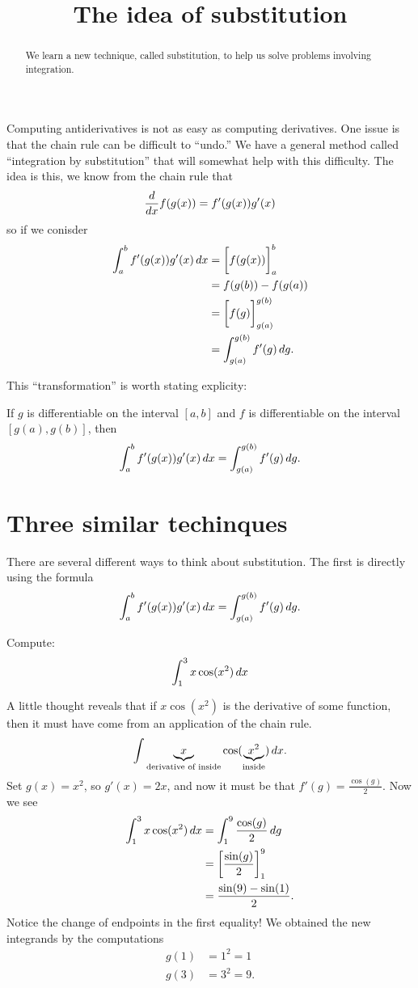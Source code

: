 \documentclass{ximera}
\title[Dig-In:]{The idea of substitution}
\begin{document}
\begin{abstract}
  We learn a new technique, called substitution, to help us solve
  problems involving integration.
\end{abstract}
\maketitle


Computing antiderivatives is not as easy as computing derivatives.
One issue is that the chain rule can be difficult to ``undo.''  We
have a general method called ``integration by substitution'' that will
somewhat help with this difficulty. The idea is this, we know from the
chain rule that
\[
\frac{d}{\mathop{}\!d x} f(g(x)) = f'(g(x))g'(x)
\]
so if we conisder
\begin{align*}
  \int_a^b f'(g(x))g'(x) \mathop{}\!d x &= \bigg[ f(g(x)) \bigg]_a^b \\
  &= f(g(b)) - f(g(a)) \\
  &= \bigg[ f(g) \bigg]_{g(a)}^{g(b)}\\
  &= \int_{g(a)}^{g(b)}f'(g) \mathop{}\!d g.
\end{align*}

This ``transformation'' is worth stating explicity:

\begin{theorem} 
If $g$ is differentiable on the interval $[a,b]$ and $f$ is
differentiable on the interval $[g(a),g(b)]$, then
\[
\int_a^b f'(g(x)) g'(x) \mathop{}\!d x =\int_{g(a)}^{g(b)} f'(g) \mathop{}\!d g.
\]
\end{theorem}

\section{Three similar techinques}

There are several different ways to think about substitution. The
first is directly using the formula
\[
\int_a^b f'(g(x)) g'(x) \mathop{}\!d x = \int_{g(a)}^{g(b)} f'(g) \mathop{}\!d g.
\]
\begin{example}
Compute:
\[
\int_1^3 x\cos(x^2)\mathop{}\!d x
\]
\begin{explanation}
A little thought reveals that if $x\cos(x^2)$ is the derivative of
some function, then it must have come from an application of the chain
rule. 
\[
\int \underbrace{x}_{\text{derivative of inside}}\cos(\underbrace{x^2}_{\text{inside}})\mathop{}\!d x.
\]
Set $g(x) = x^2$, so $g'(x) = 2x$, and now it must be that $f'(g) =
\frac{\cos(g)}{2}$. Now we see
\begin{align*}
\int_1^3 x\cos(x^2)\mathop{}\!d x &= \int_1^9 \frac{\cos(g)}{2}\mathop{}\!d g\\
&= \bigg[ \frac{\sin(g)}{2} \bigg]_1^9 \\
&= \frac{\sin(9) -\sin(1)}{2}.
\end{align*}
Notice the change of endpoints in the first equality!  
We obtained the new integrands by the computations
\begin{align*}
g(1) &= 1^2 = 1  \\
g(3) &= 3^2 = 9.
\end{align*}
\end{explanation}
\end{example}
\end{document}
